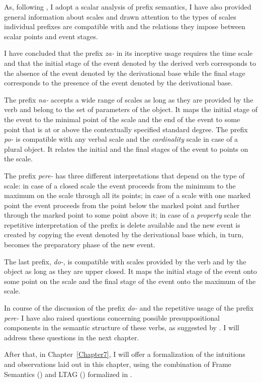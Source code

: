 As, following \citet{Kagan:book}, I adopt a scalar analysis of prefix semantics, I have also provided general information about scales and drawn attention to the types of scales individual prefixes are compatible with and the relations they impose between scalar points and event stages. 

I have concluded that the prefix \textit{za-} in its inceptive usage requires the time scale and that the initial stage of the event denoted by the derived verb corresponds to the absence of the event denoted by the derivational base while the final stage corresponds to the presence of the event denoted by the derivational base. 

The prefix \textit{na-} accepts a wide range of scales as long as they are provided by the verb and belong to the set of parameters of the object. It maps the initial stage of the event to the minimal point of the scale and the end of the event to some point that is at or above the contextually specified standard degree. The prefix \textit{po-} is compatible with any verbal scale and the \textit{cardinality} scale in case of a plural object. It relates the initial and the final stages of the event to points on the scale. 

The prefix \textit{pere-} has three different interpretations that depend on the type of scale: in case of a closed scale the event proceeds from the minimum to the maximum on the scale through all its points; in case of a scale with one marked point the event proceeds from the point below the marked point and further through the marked point to some point above it; in case of a \textit{property} scale the repetitive interpretation of the prefix is delete available and the new event is created by copying the event denoted by the derivational base which, in turn, becomes the preparatory phase of the new event. 

The last prefix, \textit{do-}, is compatible with scales provided by the verb and by the object as long as they are upper closed. It maps the initial stage of the event onto some point on the scale and the final stage of the event onto the maximum of the scale. 

In course of the discussion of the prefix \textit{do-} and the repetitive usage of the prefix \textit{pere-} I have also raised questions concerning possible presuppositional components in the semantic structure of these verbs, as suggested by \citet{Kagan:book}. I will address these questions in the next chapter.

After that, in Chapter~\ref{Chapter7}, I will offer a formalization of the intuitions and observations laid out in this chapter, using the combination of Frame Semantics (\citealt{Fillmore:82}) and LTAG (\citealt{JoshiSchabes:97}) formalized in \citealt{KallmeyerOsswald:13}. 

